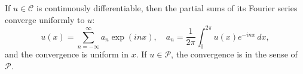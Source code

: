 If $u \in \mathcal{C}$ is continuously differentiable, then the partial sums of its Fourier series converge uniformly to $u$:
\[
u(x) = \sum_{n=-\infty}^{\infty} a_n \exp(inx), \quad a_n = \frac{1}{2\pi} \int_0^{2\pi} u(x)e^{-inx}\,dx,
\]
and the convergence is uniform in $x$. If $u \in \mathcal{P}$, the convergence is in the sense of $\mathcal{P}$.
